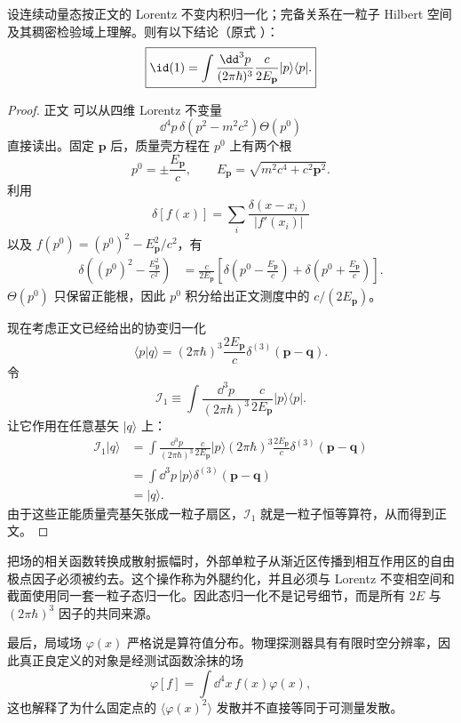\begin{proposition}[连续一粒子态的完备测度]
设连续动量态按正文的 Lorentz 不变内积归一化；完备关系在一粒子 Hilbert 空间及其稠密检验域上理解。则有以下结论（原式 ）：
\begin{equation*}
\boxed{
\id(1)
=\int\frac{\dd^3 p}{(2\pi\hbar)^3}\frac{c}{2E_{\mathbf p}}
|p\rangle\langle p|.}
\end{equation*}
\end{proposition}
\begin{proof}
正文 可以从四维 Lorentz 不变量
\[
\dd^4 p\,\delta(p^2-m^2c^2)\Theta(p^0)
\]
直接读出。固定 $\mathbf p$ 后，质量壳方程在 $p^0$ 上有两个根
\[
p^0=\pm\frac{E_{\mathbf p}}{c},
\qquad
E_{\mathbf p}=\sqrt{m^2c^4+c^2\mathbf p^2}.
\]
利用
\[
\delta[f(x)]=\sum_i\frac{\delta(x-x_i)}{|f'(x_i)|}
\]
以及 $f(p^0)=(p^0)^2-E_{\mathbf p}^2/c^2$，有
\begin{align*}
\delta\!\left((p^0)^2-\frac{E_{\mathbf p}^2}{c^2}\right)
&=\frac{c}{2E_{\mathbf p}}
\left[
\delta\!\left(p^0-\frac{E_{\mathbf p}}c\right)
+\delta\!\left(p^0+\frac{E_{\mathbf p}}c\right)
\right].
\end{align*}
$\Theta(p^0)$ 只保留正能根，因此 $p^0$ 积分给出正文测度中的 $c/(2E_{\mathbf p})$。

现在考虑正文已经给出的协变归一化
\[
\langle p|q\rangle
=(2\pi\hbar)^3\frac{2E_{\mathbf p}}{c}
\delta^{(3)}(\mathbf p-\mathbf q).
\]
令
\[
\mathcal I_1
\equiv
\int\frac{\dd^3 p}{(2\pi\hbar)^3}
\frac{c}{2E_{\mathbf p}}|p\rangle\langle p|.
\]
让它作用在任意基矢 $|q\rangle$ 上：
\begin{align*}
\mathcal I_1|q\rangle
&=\int\frac{\dd^3 p}{(2\pi\hbar)^3}
\frac{c}{2E_{\mathbf p}}|p\rangle
(2\pi\hbar)^3\frac{2E_{\mathbf p}}c
\delta^{(3)}(\mathbf p-\mathbf q)\\
&=\int\dd^3 p\,|p\rangle
\delta^{(3)}(\mathbf p-\mathbf q)\\
&=|q\rangle.
\end{align*}
由于这些正能质量壳基矢张成一粒子扇区，$\mathcal I_1$ 就是一粒子恒等算符，从而得到正文。
\end{proof}

把场的相关函数转换成散射振幅时，外部单粒子从渐近区传播到相互作用区的自由极点因子必须被约去。这个操作称为外腿约化，并且必须与 Lorentz 不变相空间和截面使用同一套一粒子态归一化。因此态归一化不是记号细节，而是所有 $2E$ 与 $(2\pi\hbar)^3$ 因子的共同来源。

最后，局域场 $\varphi(x)$ 严格说是算符值分布。物理探测器具有有限时空分辨率，因此真正良定义的对象是经测试函数涂抹的场
\begin{equation*}
\varphi[f]=\int \dd^4 x\,f(x)\varphi(x),
\end{equation*}
这也解释了为什么固定点的 $\langle\varphi(x)^2\rangle$ 发散并不直接等同于可测量发散。

